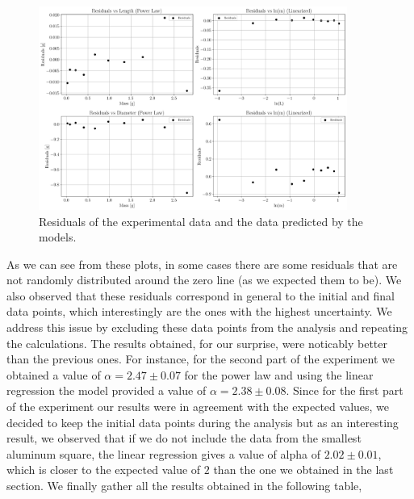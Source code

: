 \documentclass[a4paper,12pt]{article}
\begin{document}
\begin{figure}[h!]
    \centering
    \includegraphics[width = 0.9\textwidth]{residuals.png}
    \caption{Residuals of the experimental data and the data predicted by the models.}
    \label{fig:residuals}
\end{figure} 
 
As we can see from these plots, in some cases there are some residuals that are not randomly distributed 
around the zero line (as we expected them to be). We also observed that these residuals correspond in general 
to the initial and final data points, which interestingly are the ones with the highest uncertainty. We address 
this issue by excluding these data points from the analysis and repeating the calculations. The results obtained, 
for our surprise, were noticably better than the previous ones. For instance, for the second part of the experiment
we obtained a value of $\alpha = 2.47 \pm 0.07$ for the power law and using the linear regression the model provided 
a value of $\alpha = 2.38 \pm 0.08$. Since for the first part of the experiment our results were in agreement with the
expected values, we decided to keep the initial data points during the analysis but as an interesting result, we 
observed that if we do not include the data from the smallest aluminum square, the linear regression gives a value of 
alpha of $2.02 \pm 0.01$, which is closer to the expected value of $2$ than the one we obtained in the last section. 
We finally gather all the results obtained in the following table, 
\end{document}
